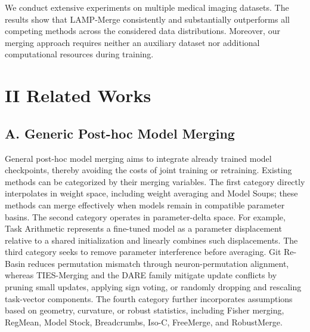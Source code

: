 \documentclass[letterpaper]{article} %
\begin{document}
We conduct extensive experiments on multiple medical imaging datasets. The results show that LAMP-Merge consistently and substantially outperforms all competing methods across the considered data distributions. Moreover, our merging approach requires neither an auxiliary dataset nor additional computational resources during training.

\section{II Related Works}

\subsection{A. Generic Post-hoc Model Merging}

General post-hoc model merging aims to integrate already trained model checkpoints, thereby avoiding the costs of joint training or retraining. Existing methods can be categorized by their merging variables. The first category directly interpolates in weight space, including weight averaging and Model Soups; these methods can merge effectively when models remain in compatible parameter basins. The second category operates in parameter-delta space. For example, Task Arithmetic represents a fine-tuned model as a parameter displacement relative to a shared initialization and linearly combines such displacements. The third category seeks to remove parameter interference before averaging. Git Re-Basin reduces permutation mismatch through neuron-permutation alignment, whereas TIES-Merging and the DARE family mitigate update conflicts by pruning small updates, applying sign voting, or randomly dropping and rescaling task-vector components. The fourth category further incorporates assumptions based on geometry, curvature, or robust statistics, including Fisher merging, RegMean, Model Stock, Breadcrumbs, Iso-C, FreeMerge, and RobustMerge.
\end{document}
